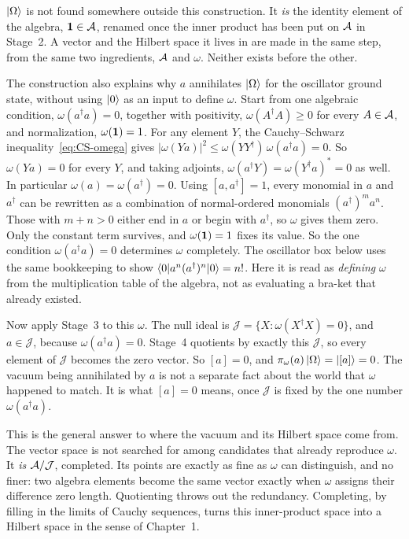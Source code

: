 \begin{physconnect}
$\ket\Omega$ is not found somewhere outside this construction. It \emph{is} the identity element of the
algebra, $\mathbf{1}\in\mathcal{A}$, renamed once the inner product has been put on $\mathcal{A}$ in Stage~2. A vector and the
Hilbert space it lives in are made in the same step, from the same two ingredients, $\mathcal{A}$ and $\omega$.
Neither exists before the other.

The construction also explains why $a$ annihilates $\ket\Omega$ for the oscillator ground state, without
using $\ket0$ as an input to define $\omega$. Start from one algebraic condition, $\omega(a^\dagger a)=0$,
together with positivity, $\omega(A^\dagger A)\ge0$ for every $A\in\mathcal{A}$, and normalization,
$\omega(\mathbf{1})=1$. For any element $Y$, the Cauchy--Schwarz inequality~\eqref{eq:CS-omega} gives
$|\omega(Ya)|^2\le\omega(YY^\dagger)\,\omega(a^\dagger a)=0$. So $\omega(Ya)=0$ for every $Y$, and taking
adjoints, $\omega(a^\dagger Y)=\omega(Y^\dagger a)^*=0$ as well. In particular $\omega(a)=\omega(a^\dagger)=0$.
Using $[a,a^\dagger]=1$, every monomial in $a$ and $a^\dagger$ can be rewritten as a combination of
normal-ordered monomials $(a^\dagger)^ma^n$. Those with $m+n>0$ either end in $a$ or begin with $a^\dagger$,
so $\omega$ gives them zero. Only the constant term survives, and $\omega(\mathbf{1})=1$ fixes its value. So the one
condition $\omega(a^\dagger a)=0$ determines $\omega$ completely. The oscillator box below uses the same
bookkeeping to show $\braket{0|a^n(a^\dagger)^n|0}=n!$. Here it is read as \emph{defining} $\omega$ from the
multiplication table of the algebra, not as evaluating a bra-ket that already existed.

Now apply Stage~3 to this $\omega$. The null ideal is $\mathcal J=\{X:\omega(X^\dagger X)=0\}$, and
$a\in\mathcal J$, because $\omega(a^\dagger a)=0$. Stage~4 quotients by exactly this $\mathcal J$, so every
element of $\mathcal J$ becomes the zero vector. So $[a]=0$, and $\pi_\omega(a)\ket\Omega=\ket{[a]}=0$. The
vacuum being annihilated by $a$ is not a separate fact about the world that $\omega$ happened to match. It is
what $[a]=0$ means, once $\mathcal J$ is fixed by the one number $\omega(a^\dagger a)$.

This is the general answer to where the vacuum and its Hilbert space come from. The vector space is not
searched for among candidates that already reproduce $\omega$. It \emph{is} $\mathcal{A}/\mathcal J$, completed. Its
points are exactly as fine as $\omega$ can distinguish, and no finer: two algebra elements become the same
vector exactly when $\omega$ assigns their difference zero length. Quotienting throws out the redundancy.
Completing, by filling in the limits of Cauchy sequences, turns this inner-product space into a Hilbert space
in the sense of Chapter~1.


\end{physconnect}
